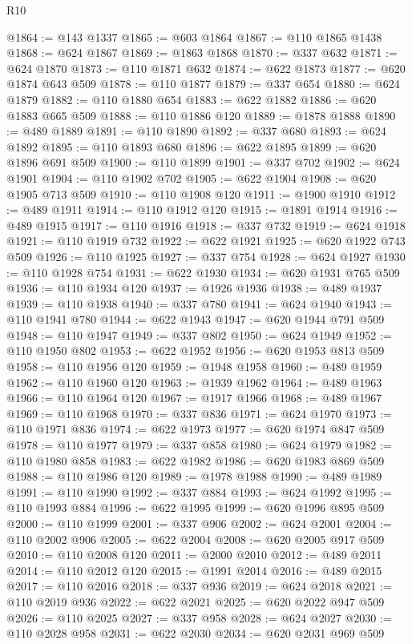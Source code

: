 \begin{lexlean}{R10}
\begin{coremodule}
{{{{{{{{{{{{{{{{{{{{{{{{{{{{{{{{{{{{{{{{{{{{{{{{{{{{{{{{{{{{{{{{{{{{{{{{{{{{{{{{{{{{@1864 := @143 @1337
@1865 := @603 @1864
@1867 := @110 @1865 @1438
@1868 := @624 @1867
@1869 := @1863 @1868
@1870 := @337 @632
@1871 := @624 @1870
@1873 := @110 @1871 @632
@1874 := @622 @1873
@1877 := @620 @1874 @643 @509
@1878 := @110 @1877
@1879 := @337 @654
@1880 := @624 @1879
@1882 := @110 @1880 @654
@1883 := @622 @1882
@1886 := @620 @1883 @665 @509
@1888 := @110 @1886 @120
@1889 := @1878 @1888
@1890 := @489 @1889
@1891 := @110 @1890
@1892 := @337 @680
@1893 := @624 @1892
@1895 := @110 @1893 @680
@1896 := @622 @1895
@1899 := @620 @1896 @691 @509
@1900 := @110 @1899
@1901 := @337 @702
@1902 := @624 @1901
@1904 := @110 @1902 @702
@1905 := @622 @1904
@1908 := @620 @1905 @713 @509
@1910 := @110 @1908 @120
@1911 := @1900 @1910
@1912 := @489 @1911
@1914 := @110 @1912 @120
@1915 := @1891 @1914
@1916 := @489 @1915
@1917 := @110 @1916
@1918 := @337 @732
@1919 := @624 @1918
@1921 := @110 @1919 @732
@1922 := @622 @1921
@1925 := @620 @1922 @743 @509
@1926 := @110 @1925
@1927 := @337 @754
@1928 := @624 @1927
@1930 := @110 @1928 @754
@1931 := @622 @1930
@1934 := @620 @1931 @765 @509
@1936 := @110 @1934 @120
@1937 := @1926 @1936
@1938 := @489 @1937
@1939 := @110 @1938
@1940 := @337 @780
@1941 := @624 @1940
@1943 := @110 @1941 @780
@1944 := @622 @1943
@1947 := @620 @1944 @791 @509
@1948 := @110 @1947
@1949 := @337 @802
@1950 := @624 @1949
@1952 := @110 @1950 @802
@1953 := @622 @1952
@1956 := @620 @1953 @813 @509
@1958 := @110 @1956 @120
@1959 := @1948 @1958
@1960 := @489 @1959
@1962 := @110 @1960 @120
@1963 := @1939 @1962
@1964 := @489 @1963
@1966 := @110 @1964 @120
@1967 := @1917 @1966
@1968 := @489 @1967
@1969 := @110 @1968
@1970 := @337 @836
@1971 := @624 @1970
@1973 := @110 @1971 @836
@1974 := @622 @1973
@1977 := @620 @1974 @847 @509
@1978 := @110 @1977
@1979 := @337 @858
@1980 := @624 @1979
@1982 := @110 @1980 @858
@1983 := @622 @1982
@1986 := @620 @1983 @869 @509
@1988 := @110 @1986 @120
@1989 := @1978 @1988
@1990 := @489 @1989
@1991 := @110 @1990
@1992 := @337 @884
@1993 := @624 @1992
@1995 := @110 @1993 @884
@1996 := @622 @1995
@1999 := @620 @1996 @895 @509
@2000 := @110 @1999
@2001 := @337 @906
@2002 := @624 @2001
@2004 := @110 @2002 @906
@2005 := @622 @2004
@2008 := @620 @2005 @917 @509
@2010 := @110 @2008 @120
@2011 := @2000 @2010
@2012 := @489 @2011
@2014 := @110 @2012 @120
@2015 := @1991 @2014
@2016 := @489 @2015
@2017 := @110 @2016
@2018 := @337 @936
@2019 := @624 @2018
@2021 := @110 @2019 @936
@2022 := @622 @2021
@2025 := @620 @2022 @947 @509
@2026 := @110 @2025
@2027 := @337 @958
@2028 := @624 @2027
@2030 := @110 @2028 @958
@2031 := @622 @2030
@2034 := @620 @2031 @969 @509
}}}}}}}}}}}}}}}}}}}}}}}}}}}}}}}}}}}}}}}}}}}}}}}}}}}}}}}}}}}}}}}}}}}}}}}}}}}}}}}}}}}}
\end{coremodule}
\end{lexlean}
